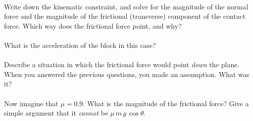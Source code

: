 \documentclass[12pt]{article}
\begin{document}
\paragraph{\theproblem}%
Write down the kinematic constraint, and solve for the magnitude of
the normal force and the magnitude of the frictional (transverse)
component of the contact force.  Which way does the frictional force
point, and why?

\paragraph{\theproblem}%
What is the acceleration of the block in this case?

\paragraph{\theproblem}%
Describe a situation in which the frictional force would point
\emph{down} the plane.  When you answered the previous questions, you
made an assumption.  What was it?

\paragraph{\theproblem}%
Now imagine that $\mu=0.9$.  What is the magnitude of the frictional
force? Give a simple argument that it \emph{cannot} be
$\mu\,m\,g\,\cos\theta$.
\end{document}
